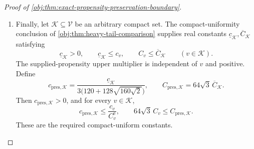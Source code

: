 \documentclass[11pt]{article}
\begin{document}
\begin{proof}[Proof of \cref{obj:thm:exact-propensity-preservation-boundary}]
\begin{enumerate}
\item Finally, let \(\mathcal K\subseteq\mathcal V\) be an arbitrary compact set.
The compact-uniformity conclusion of
\cref{obj:thm:heavy-tail-comparison} supplies real constants
\(\underline c_{\mathcal K},\overline C_{\mathcal K}\) satisfying
\[
\underline c_{\mathcal K}>0,
\qquad
\underline c_{\mathcal K}\le c_v,
\qquad
C_v\le\overline C_{\mathcal K}
\qquad(v\in\mathcal K).
\]
The supplied-propensity upper multiplier is independent of \(v\) and positive. Define
\[
c_{\mathrm{pres},\mathcal K}
=
\frac{\underline c_{\mathcal K}}
{3\bigl(120+128\sqrt{160\sqrt2}\bigr)},
\qquad
C_{\mathrm{pres},\mathcal K}
=
64\sqrt3\,\overline C_{\mathcal K}.
\]
Then \(c_{\mathrm{pres},\mathcal K}>0\), and for every \(v\in\mathcal K\),
\[
c_{\mathrm{pres},\mathcal K}
\le\frac{c_v}{C^{\mathrm e}_v},
\qquad
64\sqrt3\,C_v
\le C_{\mathrm{pres},\mathcal K}.
\]
These are the required compact-uniform constants.
\end{enumerate}
\end{proof}




\end{document}
